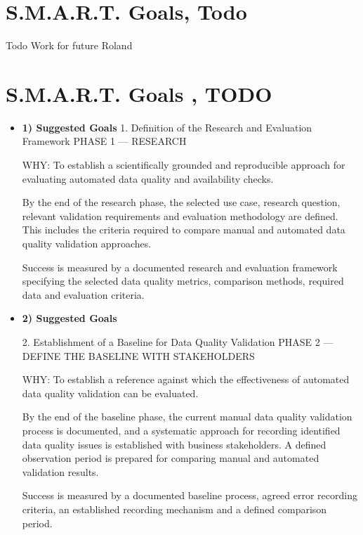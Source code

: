 
\section{S.M.A.R.T. Goals, Todo}

Todo
Work for future Roland


\section{S.M.A.R.T. Goals , TODO}
\label{ResearchSmartGoals}

\begin{itemize}





\item \textbf{1) Suggested Goals}
1. Definition of the Research and Evaluation Framework
PHASE 1 — RESEARCH

WHY: To establish a scientifically grounded and reproducible approach for evaluating automated data quality and availability checks.

By the end of the research phase, the selected use case, research question, relevant validation requirements and evaluation methodology are defined. This includes the criteria required to compare manual and automated data quality validation approaches.

Success is measured by a documented research and evaluation framework specifying the selected data quality metrics, comparison methods, required data and evaluation criteria.



\item \textbf{2) Suggested Goals}

2. Establishment of a Baseline for Data Quality Validation
PHASE 2 — DEFINE THE BASELINE WITH STAKEHOLDERS

WHY: To establish a reference against which the effectiveness of automated data quality validation can be evaluated.

By the end of the baseline phase, the current manual data quality validation process is documented, and a systematic approach for recording identified data quality issues is established with business stakeholders. A defined observation period is prepared for comparing manual and automated validation results.

Success is measured by a documented baseline process, agreed error recording criteria, an established recording mechanism and a defined comparison period.


\end{itemize}
